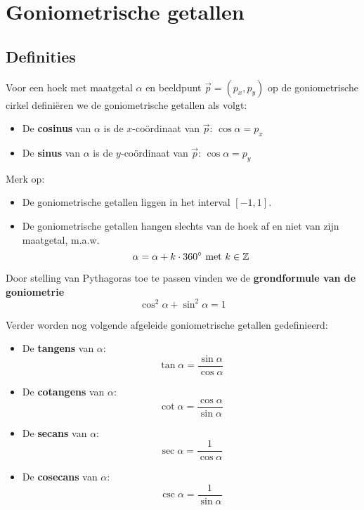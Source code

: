 \documentclass[a4paper,12pt]{article}
\begin{document}
\onehalfspacing

\section{Goniometrische getallen}

\begin{theorie}

\subsection{Definities}

Voor een hoek met maatgetal $\alpha$ en beeldpunt $\vec{p}=(p_x,p_y)$ op de goniometrische cirkel definiëren we de goniometrische getallen als volgt:

\begin{itemize}
  \item De {\bf cosinus} van $\alpha$ is de $x$-coördinaat van $\vec{p}$: $\cos\alpha=p_x$
  \item De {\bf sinus} van $\alpha$ is de $y$-coördinaat van $\vec{p}$: $\cos\alpha=p_y$
\end{itemize}

Merk op:
\begin{itemize}
  \item De goniometrische getallen liggen in het interval $[-1,1]$.
  \item De goniometrische getallen hangen slechts van de hoek af en niet van zijn maatgetal, m.a.w.
  $$\alpha = \alpha + k\cdot 360^\circ\mbox{ met }k\in\mathbb{Z}$$
\end{itemize}

Door stelling van Pythagoras toe te passen vinden we de {\bf grondformule van de goniometrie}
$$\cos^2\alpha + \sin^2\alpha = 1$$

Verder worden nog volgende afgeleide goniometrische getallen gedefinieerd:
\begin{itemize}
  \item De {\bf tangens} van $\alpha$:
  $$\tan\alpha=\dfrac{\sin\alpha}{\cos\alpha}$$
  \item De {\bf cotangens} van $\alpha$:
  $$\cot\alpha=\dfrac{\cos\alpha}{\sin\alpha}$$
  \item De {\bf secans} van $\alpha$:
  $$\sec\alpha=\dfrac{1}{\cos\alpha}$$
  \item De {\bf cosecans} van $\alpha$:
  $$\csc\alpha=\dfrac{1}{\sin\alpha}$$
\end{itemize}

\end{theorie}
\end{document}
